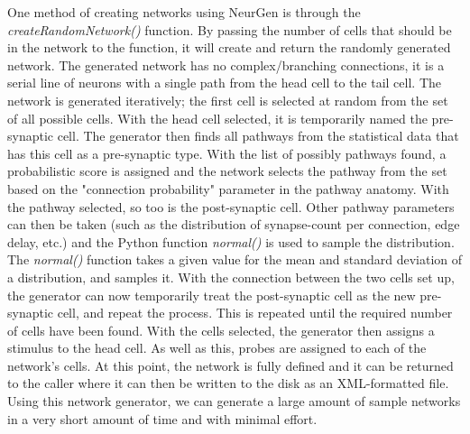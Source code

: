 \documentclass[letterpaper, 10 pt, conference]{ieeeconf}  %
\begin{document}
One method of creating networks using NeurGen is through the \emph{createRandomNetwork()} function. By passing the number of cells that should be in the network to the function, it will create and return the randomly generated network. The generated network has no complex/branching connections, it is a serial line of neurons with a single path from the head cell to the tail cell. The network is generated iteratively; the first cell is selected at random from the set of all possible cells. With the head cell selected, it is temporarily named the pre-synaptic cell. The generator then finds all pathways from the statistical data that has this cell as a pre-synaptic type. With the list of possibly pathways found, a probabilistic score is assigned and the network selects the pathway from the set based on the "connection probability" parameter in the pathway anatomy. With the pathway selected, so too is the post-synaptic cell. Other pathway parameters can then be taken (such as the distribution of synapse-count per connection, edge delay, etc.) and the Python function \emph{normal()} is used to sample the distribution. The \emph{normal()} function takes a given value for the mean and standard deviation of a distribution, and samples it. With the connection between the two cells set up, the generator can now temporarily treat the post-synaptic cell as the new pre-synaptic cell, and repeat the process. This is repeated until the required number of cells have been found. With the cells selected, the generator then assigns a stimulus to the head cell. As well as this, probes are assigned to each of the network's cells. At this point, the network is fully defined and it can be returned to the caller where it can then be written to the disk as an XML-formatted file. Using this network generator, we can generate a large amount of sample networks in a very short amount of time and with minimal effort.\\
\end{document}
